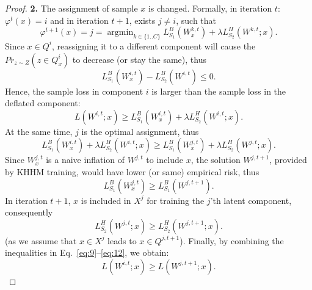 \documentclass[twoside,11pt]{article}
\newcommand{\argmin}{\mathop{\mathrm{argmin}}}
\begin{document}
\begin{proof}
\noindent\textbf{2.} The assignment of sample $x$  is changed. Formally, in iteration $t$: $\varphi^{t}(x)=i$ and in iteration $t+1$, exists $j \ne i$,  such that
\begin{equation}
\varphi^{t+1}(x)=j=
\argmin_{k\in\{1..C\}} {L^B_{S_1} \left(W^{k,t}_x\right)+ \lambda L^H_{S_2}\left(W^{k,t};x\right)}.
\end{equation}
Since $x \in Q^i$, reassigning it to a different component will cause  the $Pr_{z\sim Z}(z \in Q^i_x)$ to decrease (or stay the same), thus
\begin{equation}
L^B_{S_1}(W^{i,t}_x) - L^B_{S_2}(W^{i,t}) \le 0.
\end{equation}
Hence, the sample loss in component $i$ is larger than the sample loss in the deflated component:
\begin{equation}\label{eq:9}
L\left(W^{i,t};x\right) \geq L^B_{S_1}\left(W^{i,t}_x\right) + \lambda L^H_{S_2}\left(W^{i,t};x\right).
\end{equation}
At the same time, $j$ is the optimal assignment, thus
\begin{equation}\label{eq:10}
L^B_{S_1}\left(W^{i,t}_x\right) + \lambda L^H_{S_2}\left(W^{i,t};x\right) \ge L^B_{S_1}\left(W^{j,t}_x\right) + \lambda L^H_{S_2}\left(W^{j,t};x\right).
\end{equation}
Since $W^{j,t}_x$ is a naive inflation of $W^{j,t}$ to include $x$, the solution  $W^{j,t+1}$, provided by KHHM training, would have lower (or same) empirical risk, thus
\begin{equation}\label{eq:11}
L^B_{S_1}\left(W^{j,t}_x\right)\geq L^B_{S_1}(W^{j,t+1}).
\end{equation}
In iteration $t+1$, $x$ is included in $X^j$ for training  the $j$'th latent component, consequently
\begin{equation}\label{eq:12}
L^H_{S_2}\left(W^{j,t};x\right)\geq L^H_{S_2}(W^{j,t+1};x).
\end{equation}
(as we assume that $x\in X^j$ leads to $x\in Q^{j,t+1}$).
Finally, by combining the inequalities in Eq.~\ref{eq:9}--\ref{eq:12}, we obtain:
\begin{equation}
L\left(W^{i,t};x\right) \geq L\left(W^{j,t+1};x\right).
\end{equation}
\end{proof}
\end{document}
